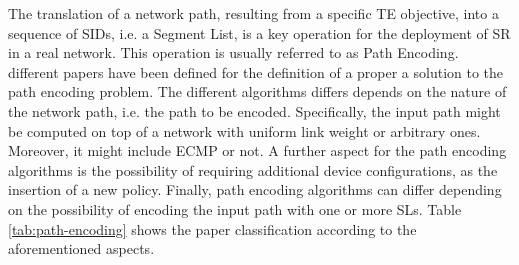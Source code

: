 The translation of a network path, resulting from a specific TE objective, into a sequence of SIDs, i.e. a Segment List, is a key operation for the deployment of SR in a real network. This operation is usually referred to as Path Encoding.
\PathencPapers different papers have been defined for the definition of a proper a solution to the path encoding problem.
The different algorithms differs depends on the nature of the network path, i.e. the path to be encoded.
Specifically, the input path might be computed on top of a network with uniform link weight or arbitrary ones.
Moreover, it might include ECMP or not.
A further aspect for the path encoding algorithms is the possibility of requiring additional device configurations, as the insertion of a new policy.
Finally, path encoding algorithms can differ depending on the possibility of encoding the input path with one or more SLs.
Table \ref{tab:path-encoding} shows the paper classification according to the aforementioned aspects.

